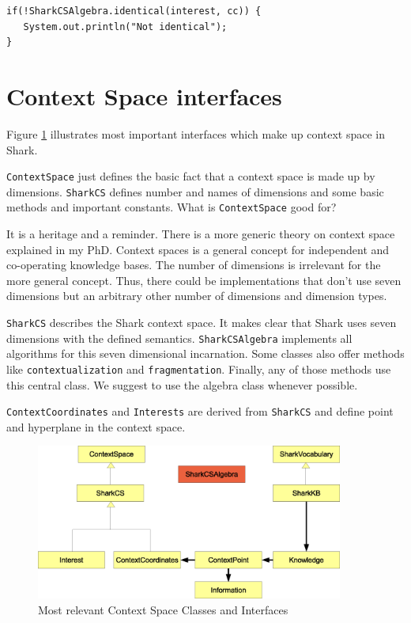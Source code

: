 \begin{verbatim}
if(!SharkCSAlgebra.identical(interest, cc)) {
   System.out.println("Not identical");
}
\end{verbatim}

\section{Context Space interfaces}
Figure \ref{fig:contextSpaceHierarchy} illustrates most important interfaces which make up context space in Shark.

{\tt ContextSpace} just defines the basic fact that a context space is made up by dimensions. {\tt SharkCS} defines number and names of dimensions and some basic methods and important constants. What is {\tt ContextSpace} good for?

It is a heritage and a reminder. There is a more generic theory on context space explained in my PhD. Context spaces is a general concept for independent and co-operating knowledge bases. The number of dimensions is irrelevant for the more general concept. Thus, there could be implementations that don't use seven dimensions but an arbitrary other number of dimensions and dimension types.

{\tt SharkCS} describes the Shark context space. It makes clear that Shark uses seven dimensions with the defined semantics. {\tt SharkCSAlgebra} implements all algorithms for this seven dimensional incarnation. Some classes also offer methods like {\tt contextualization} and {\tt fragmentation}. Finally, any of those methods use this central class. We suggest to use the algebra class whenever possible.

{\tt ContextCoordinates} and {\tt Interests} are derived from {\tt SharkCS} and define point and hyperplane in the context space.

\begin{figure}[t]
\centering
\includegraphics[width=0.90\textwidth]{CSInterfaces.eps}
\caption{Most relevant Context Space Classes and Interfaces}
\label{fig:contextSpaceHierarchy}
\end{figure}

